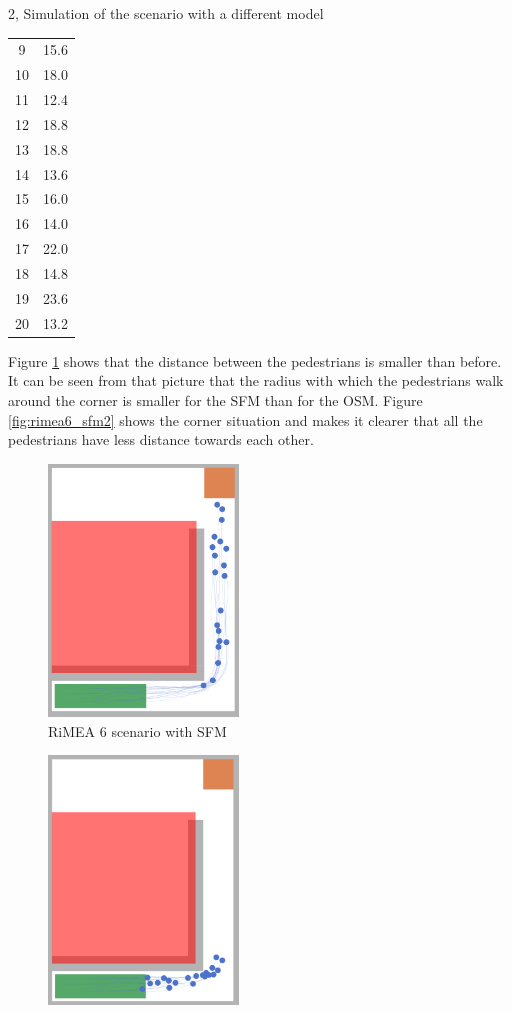\documentclass[10pt,a4paper]{article}
\begin{document}
\begin{task}{2, Simulation of the scenario with a different model}
\begin{itemize}
\begin{tabular}{c|c}
         9&15.6\\
         10&18.0\\
         11&12.4\\
         12&18.8\\
         13&18.8\\
         14&13.6\\
         15&16.0\\
         16&14.0\\
         17&22.0\\
         18&14.8\\
         19&23.6\\
         20&13.2\\
    \end{tabular}
    \bigbreak
    Figure \ref{fig:rimea6_sfm} shows that the distance between the pedestrians is smaller than before. It can be seen from that picture that the radius with which the pedestrians walk around the corner is smaller for the SFM than for the OSM. Figure \ref{fig:rimea6_sfm2} shows the corner situation and makes it clearer that all the pedestrians have less distance towards each other.
    \begin{figure}[H]
        \centering
        \includegraphics[width=0.45\textwidth]{pictures/sfm/rimeatest6.png}
        \caption{RiMEA 6 scenario with SFM}
        \label{fig:rimea6_sfm}
    \end{figure}
    \begin{figure}[H]
        \centering
        \includegraphics[width=0.45\textwidth]{pictures/sfm/rimeatest6_atcorner.png}

\end{figure}
\end{itemize}
\end{task}
\end{document}
